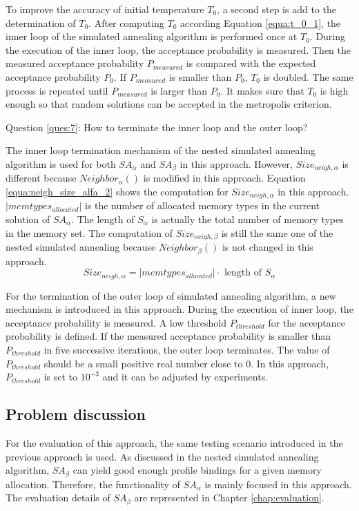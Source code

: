 		To improve the accuracy of initial temperature $T_{0}$, a second step is
		add to the determination of $T_{0}$. After computing $T_{0}$ according
		Equation \ref{equa:t_0_1}, the inner loop of the simulated annealing
		algorithm is performed once at $T_{0}$.
		During the execution of the inner loop, the acceptance probability is measured.
		Then the measured acceptance probability $P_{measured}$ is compared with the
		expected acceptance probability $P_{0}$. If $P_{measured}$ is smaller than
		$P_{0}$, $T_{0}$ is doubled. The same process is repeated until $P_{measured}$
		is larger than $P_{0}$. It makes sure that $T_{0}$ is high enough so that
		random solutions can be accepted in the metropolis criterion.
		
		Question \ref{ques:7}: How to terminate the inner loop and the outer loop?
		
		The inner loop termination mechanism of the nested simulated annealing algorithm
		is used for both $SA_{\alpha}$ and $SA_{\beta}$ in this approach.
		However, $Size_{neigh,\alpha}$ is different because $Neighbor_{\alpha}()$
		is modified in this approach. Equation \ref{equa:neigh_size_alfa_2}
		shows the computation for $Size_{neigh,\alpha}$ in this approach.
		$\lvert memtypes_{allocated} \rvert$ is the number of allocated memory types in
		the current solution of $SA_{\alpha}$. The length of $S_{\alpha}$ is actually
		the total number of memory types in the memory set. The computation of $Size_{neigh,\beta}$ is
		still the same one of the nested simulated annealing because $Neighbor_{\beta}()$
		is not changed in this approach.
		\begin{equation}
		\label{equa:neigh_size_alfa_2}
			Size_{neigh,\alpha}=\lvert memtypes_{allocated} \rvert \cdot \text{ length of } S_{\alpha}
		\end{equation}
		
		For the termination of the outer loop of simulated annealing algorithm,
		a new mechanism is introduced in this approach. During the execution of inner loop,
		the acceptance probability is measured. A low threshold $P_{threshold}$ for the
		acceptance probability is defined. If the measured acceptance probability is
		smaller than $P_{threshold}$ in five successive iterations, the outer loop
		terminates. The value of $P_{threshold}$ should be a small positive real number
		close to 0. In this approach, $P_{threshold}$ is set to $10^{-3}$ and it
		can be adjusted by experiments.
		
		\subsection{Problem discussion}
		\label{subsec:problem_3}
		For the evaluation of this approach, the same testing scenario introduced in the previous
		approach is used. As discussed in the nested simulated annealing algorithm,
		$SA_{\beta}$ can yield good enough profile bindings for a given memory allocation.
		Therefore, the functionality of $SA_{\alpha}$ is mainly focused in this approach.
		The evaluation details of $SA_{\beta}$ are represented in Chapter \ref{chap:evaluation}.
		
